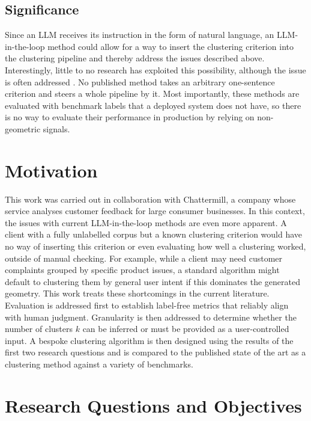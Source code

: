 \documentclass[11pt,a4paper,oneside]{report}
\begin{document}
\subsection{Significance}

Since an LLM receives its instruction in the form of natural language, an LLM-in-the-loop method could allow for a way to insert the clustering criterion into the clustering pipeline and thereby address the issues described above. Interestingly, little to no research has exploited this possibility, although the issue is often addressed \citep{vonluxburg2012science,su2023instructor,zhang2023clusterllm}. No published method takes an arbitrary one-sentence criterion and steers a whole pipeline by it. Most importantly, these methods are evaluated with benchmark labels that a deployed system does not have, so there is no way to evaluate their performance in production by relying on non-geometric signals.

\section{Motivation}

This work was carried out in collaboration with Chattermill, a company whose service analyses customer feedback for large consumer businesses. In this context, the issues with current LLM-in-the-loop methods are even more apparent. A client with a fully unlabelled corpus but a known clustering criterion would have no way of inserting this criterion or even evaluating how well a clustering worked, outside of manual checking. For example, while a client may need customer complaints grouped by specific product issues, a standard algorithm might default to clustering them by general user intent if this dominates the generated geometry. This work treats these shortcomings in the current literature. Evaluation is addressed first to establish label-free metrics that reliably align with human judgment. Granularity is then addressed to determine whether the number of clusters $k$ can be inferred or must be provided as a user-controlled input. A bespoke clustering algorithm is then designed using the results of the first two research questions and is compared to the published state of the art as a clustering method against a variety of benchmarks.

\section{Research Questions and Objectives}
\end{document}
